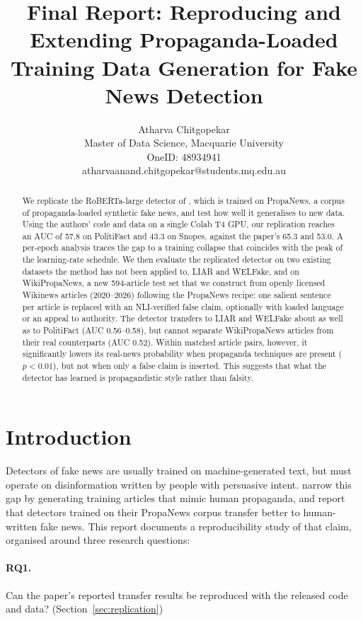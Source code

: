 \documentclass[11pt]{article}
\title{Final Report: Reproducing and Extending Propaganda-Loaded Training Data Generation for Fake News Detection}
\author{
Atharva Chitgopekar \\
Master of Data Science, Macquarie University \\
OneID: 48934941 \\
atharvaanand.chitgopekar@students.mq.edu.au
}
\begin{document}
\maketitle

\begin{abstract}
We replicate the RoBERTa-large detector of \citet{huang-etal-2023-faking}, which is trained on PropaNews, a corpus of propaganda-loaded synthetic fake news, and test how well it generalises to new data. Using the authors' code and data on a single Colab T4 GPU, our replication reaches an AUC of 57.8 on PolitiFact and 43.3 on Snopes, against the paper's 65.3 and 53.0. A per-epoch analysis traces the gap to a training collapse that coincides with the peak of the learning-rate schedule. We then evaluate the replicated detector on two existing datasets the method has not been applied to, LIAR and WELFake, and on WikiPropaNews, a new 594-article test set that we construct from openly licensed Wikinews articles (2020--2026) following the PropaNews recipe: one salient sentence per article is replaced with an NLI-verified false claim, optionally with loaded language or an appeal to authority. The detector transfers to LIAR and WELFake about as well as to PolitiFact (AUC 0.56--0.58), but cannot separate WikiPropaNews articles from their real counterparts (AUC 0.52). Within matched article pairs, however, it significantly lowers its real-news probability when propaganda techniques are present ($p<0.01$), but not when only a false claim is inserted. This suggests that what the detector has learned is propagandistic style rather than falsity.
\end{abstract}

\section{Introduction}

Detectors of fake news are usually trained on machine-generated text, but must operate on disinformation written by people with persuasive intent. \citet{huang-etal-2023-faking} narrow this gap by generating training articles that mimic human propaganda, and report that detectors trained on their PropaNews corpus transfer better to human-written fake news. This report documents a reproducibility study of that claim, organised around three research questions:

\paragraph{RQ1.} Can the paper's reported transfer results be reproduced with the released code and data? (Section~\ref{sec:replication})
\end{document}

